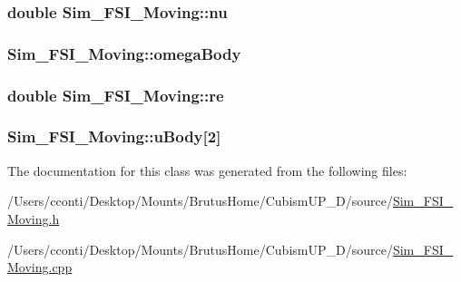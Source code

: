 \subsubsection[{nu}]{\setlength{\rightskip}{0pt plus 5cm}double Sim\+\_\+\+F\+S\+I\+\_\+\+Moving\+::nu\hspace{0.3cm}{\ttfamily [protected]}}\label{class_sim___f_s_i___moving_a396928da796eb14de27ca80c73152737}
\hypertarget{class_sim___f_s_i___moving_a355f73545a8a02945b8e8632e78692c9}{}
\subsubsection[{omega\+Body}]{ Sim\+\_\+\+F\+S\+I\+\_\+\+Moving\+::omega\+Body\hspace{0.3cm}{\ttfamily [protected]}}\label{class_sim___f_s_i___moving_a355f73545a8a02945b8e8632e78692c9}
\hypertarget{class_sim___f_s_i___moving_aa6ae4bc61dc72dc2c32f8eb7392f801b}{}
\subsubsection[{re}]{\setlength{\rightskip}{0pt plus 5cm}double Sim\+\_\+\+F\+S\+I\+\_\+\+Moving\+::re\hspace{0.3cm}{\ttfamily [protected]}}\label{class_sim___f_s_i___moving_aa6ae4bc61dc72dc2c32f8eb7392f801b}
\hypertarget{class_sim___f_s_i___moving_a0375337ef732a1485729637ca0c34057}{}
\subsubsection[{u\+Body}]{ Sim\+\_\+\+F\+S\+I\+\_\+\+Moving\+::u\+Body\mbox{[}2\mbox{]}\hspace{0.3cm}{\ttfamily [protected]}}\label{class_sim___f_s_i___moving_a0375337ef732a1485729637ca0c34057}


The documentation for this class was generated from the following files\+:\begin{DoxyCompactItemize}
\item 
/\+Users/cconti/\+Desktop/\+Mounts/\+Brutus\+Home/\+Cubism\+U\+P\+\_\+D/source/\hyperlink{_sim___f_s_i___moving_8h}{Sim\+\_\+\+F\+S\+I\+\_\+\+Moving.\+h}\item 
/\+Users/cconti/\+Desktop/\+Mounts/\+Brutus\+Home/\+Cubism\+U\+P\+\_\+D/source/\hyperlink{_sim___f_s_i___moving_8cpp}{Sim\+\_\+\+F\+S\+I\+\_\+\+Moving.\+cpp}\end{DoxyCompactItemize}
